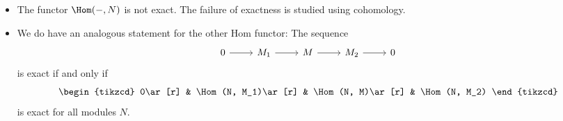 \begin{itemize}
	\item The functor $\Hom({-}, N)$ is not exact. The failure of exactness is
		studied using cohomology.
	\item We do have an analogous statement for the other Hom functor: The sequence
		\[\begin{tikzcd}
			0 \arrow[r] & M_1 \arrow[r] & M \arrow[r] & M_2 \arrow[r] & 0
		\end{tikzcd}\]
		is exact if and only if
		\[\begin{tikzcd}
			0\ar[r] & \Hom(N, M_1)\ar[r] & \Hom(N, M)\ar[r] & \Hom(N, M_2)
		\end{tikzcd}\]
		is exact for all modules $N$.
\end{itemize}
